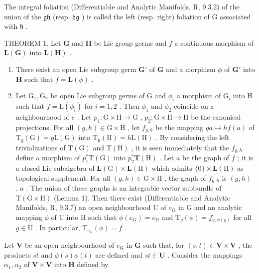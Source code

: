 The integral foliation (Differentiable and Analytic Manifolds, R, 9.3.2) of the union of the \(\mathfrak{gh}\) (resp. \(\mathfrak{hg}\) ) is called the left (resp. right) foliation of G associated with \(\mathfrak{h}\) .

THEOREM 1. Let \(\mathbf{G}\) and \(\mathbf{H}\) be Lie group germs and \(f\) a continuous morphism of \(\mathbf{L}(\mathbf{G})\) into \(\mathbf{L}(\mathbf{H})\) .

\begin{enumerate}
\def\labelenumi{(\roman{enumi})}
\item
  There exist an open Lie subgroup germ \(\mathbf{G}'\) of \(\mathbf{G}\) and a morphism \(\phi\) of \(\mathbf{G}'\) into \(\mathbf{H}\) such that \(f = \mathbf{L}(\phi)\) .
\item
  Let \(\mathrm{G}_1, \mathrm{G}_2\) be open Lie subgroup germs of G and \(\phi_i\) a morphism of \(\mathrm{G}_i\) into H such that \(f = \mathrm{L}(\phi_i)\) for \(i = 1, 2\) . Then \(\phi_1\) and \(\phi_2\) coincide on a neighbourhood of \(e\) . Let \(p_1: \mathrm{G} \times \mathrm{H} \to \mathrm{G}\) , \(p_2: \mathrm{G} \times \mathrm{H} \to \mathrm{H}\) be the canonical projections. For all \((g,h) \in \mathrm{G} \times \mathrm{H}\) , let \(f_{g,h}\) be the mapping \(ga \mapsto hf(a)\) of \(\mathrm{T_g(G)} = g\mathrm{L(G)}\) into \(\mathrm{T_h(H)} = h\mathrm{L(H)}\) . By considering the left trivializations of \(\mathrm{T(G)}\) and \(\mathrm{T(H)}\) , it is seen immediately that the \(f_{g,h}\) define a morphism of \(p_1^*\mathrm{T(G)}\) into \(p_{2}^{*}\mathbf{T}(\mathrm{H})\) . Let \(a\) be the graph of \(f\) ; it is a closed Lie subalgebra of \(\mathbf{L}(\mathrm{G}) \times \mathbf{L}(\mathrm{H})\) which admits \(\{0\} \times \mathbf{L}(\mathrm{H})\) as topological supplement. For all \((g,h) \in \mathrm{G} \times \mathrm{H}\) , the graph of \(f_{g,h}\) is \((g,h)\) . \(a\) . The union of these graphs is an integrable vector subbundle of \(\mathrm{T}(\mathrm{G} \times \mathrm{H})\) (Lemma 1). Then there exist (Differentiable and Analytic Manifolds, R, 9.3.7) an open neighbourhood \(\mathrm{U}\) of \(e_{\mathrm{G}}\) in \(\mathrm{G}\) and an analytic mapping \(\phi\) of \(\mathrm{U}\) into \(\mathrm{H}\) such that \(\phi(e_{\mathrm{G}}) = e_{\mathrm{H}}\) and \(\mathrm{T}_{g}(\phi) = f_{g,\phi(g)}\) for all \(g \in \mathrm{U}\) . In particular, \(\mathrm{T}_{e_{\mathrm{G}}}(\phi) = f\) .
\end{enumerate}

Let \(\mathbf{V}\) be an open neighbourhood of \(e_{\mathrm{G}}\) in \(\mathbf{G}\) such that, for \((s,t)\in \mathbf{V}\times \mathbf{V}\) , the products \(st\) and \(\phi (s)\phi (t)\) are defined and \(st\in \mathbf{U}\) . Consider the mappings \(\alpha_{1},\alpha_{2}\) of \(\mathbf{V}\times \mathbf{V}\) into \(\mathbf{H}\) defined by

